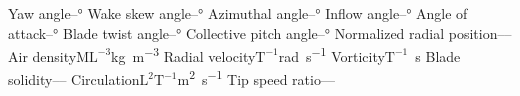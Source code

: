 \mbox{}

\newcommand{\Lunit}{\textrm{L}}                   %
\newcommand{\Munit}{\textrm{M}}                   %
\newcommand{\Tunit}{\textrm{T}}                   %
\newcommand{\Qunit}{\textrm{Q}}                   %

\nomtypeA[ZZZ]{}{} %

\nomtypeD[ZZZ]{}{}{} %

\nomtypeG{\( \gamma \)} {Yaw angle}{--}{\si{\degree}}
\nomtypeG{\( \chi \)}   {Wake skew angle}{--}{\si{\degree}}
\nomtypeG{\( \psi \)}   {Azimuthal angle}{--}{\si{\degree}}
\nomtypeG{\( \phi \)}   {Inflow angle}{--}{\si{\degree}}
\nomtypeG{\( \alpha \)} {Angle of attack}{--}{\si{\degree}}
\nomtypeG{\( \beta \)}  {Blade twist angle}{--}{\si{\degree}}
\nomtypeG{\( \theta \)} {Collective pitch angle}{--}{\si{\degree}}
\nomtypeG{\( \mu \)}    {Normalized radial position}{--}{--}
\nomtypeG{\( \rho \)}   {Air density}{\( \Munit\Lunit^{-3} \)}{\si{\kilogram\per\meter\cubed}}
\nomtypeG{\( \Omega \)} {Radial velocity}{\( \Tunit^{-1} \)}{\si{\radian\per\second}}
\nomtypeG{\( \omega \)} {Vorticity}{\( \Tunit^{-1} \)}{\si{\per\second}}
 {Blade solidity}{--}{--}
\nomtypeG{\( \Gamma \)} {Circulation}{\( \Lunit^{2} \Tunit^{-1} \)}{\si{ \meter \squared \per \second}}
\nomtypeG{\( \lambda \)} {Tip speed ratio}{--}{--}
\nomtypeG[ZZZ]{}{}{}{} %

